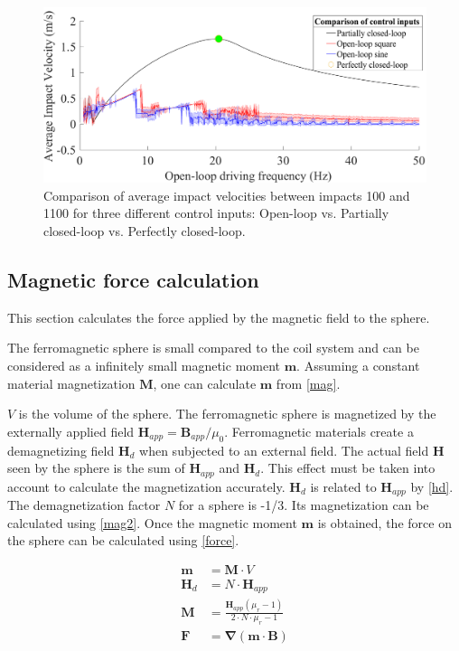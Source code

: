 \documentclass[letterpaper, 10 pt, conference]{ieeeconf}  %
\begin{document}
\begin{figure}
	\includegraphics[width=\linewidth]{ComparisonOfControlInputs.pdf}
	\caption[Comparison of impact velocities from three control inputs]{Comparison of average impact velocities between impacts 100 and 1100 for three different control inputs: Open-loop vs. Partially closed-loop vs. Perfectly closed-loop.}
	\label{CLvsOL}
	\vspace{-1.5em}
\end{figure}
\subsection{Magnetic force calculation}
\label{magforce}

This section calculates the force applied by the magnetic field to the sphere.\par
The ferromagnetic sphere is small compared to the coil system and can be considered as a infinitely small magnetic moment $\mathbf{m}$. Assuming a constant material magnetization $\mathbf{M}$, one can calculate $\mathbf{m}$ from \cref{mag}.

$V$ is the volume of the sphere.
The ferromagnetic sphere is magnetized by the externally applied field $\mathbf{H}_{app}=\mathbf{B}_{app}/\mu_0$. Ferromagnetic materials create a demagnetizing field $\mathbf{H}_d$ when subjected to an external field. The actual field $\mathbf{H}$ seen by the sphere is the sum of $\mathbf{H}_{app}$ and $\mathbf{H}_d$. This effect must be taken into account to calculate the magnetization accurately. $\mathbf{H}_d$ is related to $\mathbf{H}_{app}$ by \cref{hd}. The demagnetization factor $N$ for a sphere is -1/3. Its magnetization can be calculated using \cref{mag2}.
Once the magnetic moment $\mathbf{m}$ is obtained, the force on the sphere can be calculated using \cref{force}.
\vspace{-2em}

\begin{align}
\mathbf{m}&=\mathbf{M}\cdot V \label{mag}\\
\mathbf{H}_d&=N\cdot \mathbf{H}_{app}\label{hd}\\
\mathbf{M}&=\frac{\mathbf{H}_{app}\left ( \mu_r-1  \right )}{2\cdot N\cdot \mu_r-1} \label{mag2}\\
\mathbf{F}&=\mathbf{\nabla}(\mathbf{m}\cdot \mathbf{B}) \label{force}
\end{align}
\end{document}
